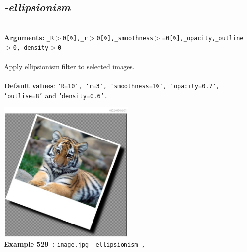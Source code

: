 \documentclass[a4paper,11pt,twoside]{book}
\begin{document}
\subsection{\emph{-ellipsionism} }\vspace*{-0.5em}
~\\\textbf{Arguments: } 
{\small \texttt{\_R$>$0[\%],\_r$>$0[\%],\_smoothness$>$=0[\%],\_opacity,\_outline$>$0,\_density$>$0}}\\~\\
Apply ellipsionism filter to selected images.
~\\~\\\textbf{Default values}: {\small \texttt{'R=10', 'r=3', 'smoothness=1\%', 'opacity=0.7', 'outlise=8'} and \texttt{'density=0.6'.}}
\begin{center}\includegraphics[keepaspectratio=true,height=7cm,width=\textwidth]{img/gmic_def529.jpg}\\
{\footnotesize \textbf{Example 529~:} \texttt{image.jpg --ellipsionism ,}}
\end{center}
\end{document}
